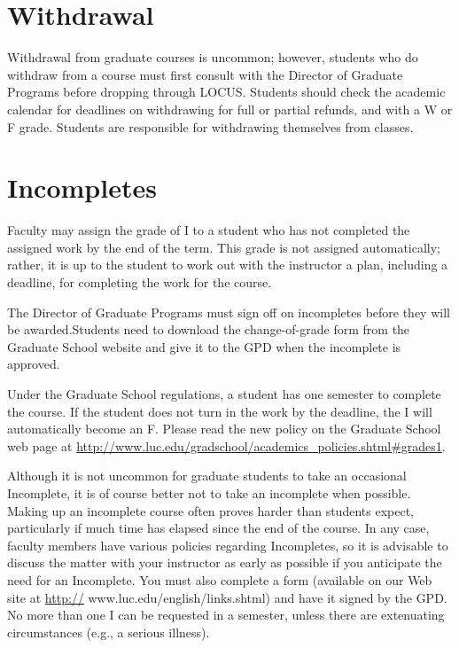 \documentclass[letterpaper,10pt,english]{sphinxmanual}
\begin{document}
\section{Withdrawal}
\label{regulations:withdrawal}
Withdrawal from graduate courses is uncommon; however, students who do withdraw from a course must first consult with the Director of Graduate Programs before dropping through LOCUS. Students should check the academic calendar for deadlines on withdrawing for full or partial refunds, and with a W or F grade. Students are responsible for withdrawing themselves from classes.


\section{Incompletes}
\label{regulations:incompletes}
Faculty may assign the grade of I to a student who has not completed the assigned work by the end of the term. This grade is not assigned automatically; rather, it is up to the student to work out with the instructor a plan, including a deadline, for completing the work for the course.

The Director of Graduate Programs must sign off on incompletes before they will be awarded.Students need to download the change-of-grade form from the Graduate School website and give it to the GPD when the incomplete is approved.

Under the Graduate School regulations, a student has one semester to complete the course. If the student does not turn in the work by the deadline, the I will automatically become an F.  Please read the new policy on the Graduate School web page at \href{http://www.luc.edu/gradschool/academics\_policies.shtml\#grades1}{http://www.luc.edu/gradschool/academics\_policies.shtml\#grades1}.

Although it is not uncommon for graduate students to take an occasional Incomplete, it is of course better not to take an incomplete when possible. Making up an incomplete course often proves harder than students expect, particularly if much time has elapsed since the end of the course. In any case, faculty members have various policies regarding Incompletes, so it is advisable to discuss the matter with your instructor as early as possible if you anticipate the need for an Incomplete. You must also complete a form (available on our Web site at \href{http://}{http://} www.luc.edu/english/links.shtml) and have it signed by the GPD. No more than one I can be requested in a semester, unless there are extenuating circumstances (e.g., a serious illness).
\end{document}
